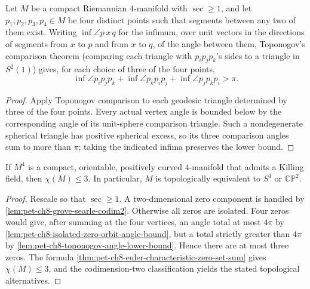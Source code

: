 \begin{lemma}
  \label{lem:pet-ch8-toponogov-angle-lower-bound}

  Let $M$ be a compact Riemannian $4$-manifold with $\sec\ge1$, and let
  $p_1,p_2,p_3,p_4\in M$ be four distinct points such that segments between any
  two of them exist. Writing $\inf\angle p\,x\,q$ for the infimum, over unit
  vectors in the directions of segments from $x$ to $p$ and from $x$ to $q$, of
  the angle between them, Toponogov's comparison theorem (comparing each
  triangle with $p_ip_jp_k$'s sides to a triangle in $S^2(1)$) gives, for each
  choice of three of the four points,
  \[
    \inf\angle p_ip_jp_k+\inf\angle p_kp_ip_j+\inf\angle p_jp_kp_i>\pi.
  \]
\end{lemma}
\begin{proof}
  \sketch
  Apply Toponogov comparison to each geodesic triangle determined by three of
  the four points. Every actual vertex angle is bounded below by the
  corresponding angle of its unit-sphere comparison triangle. Such a
  nondegenerate spherical triangle has positive spherical excess, so its three
  comparison angles sum to more than \(\pi\); taking the indicated infima
  preserves the lower bound.
\end{proof}

\begin{theorem}
  \label{thm:pet-ch8-hsiang-kleiner-4manifold}

  If $M^4$ is a compact, orientable, positively curved $4$-manifold that admits
  a Killing field, then $\chi(M)\le3$. In particular, $M$ is topologically
  equivalent to $S^4$ or $\mathbb{CP}^2$.
\end{theorem}
\begin{proof}
  \sketch
  Rescale so that \(\sec\ge1\). A two-dimensional zero component is handled by
  \cref{lem:pet-ch8-grove-searle-codim2}. Otherwise all zeros are isolated.
  Four zeros would give, after summing at the four vertices, an angle total at
  most \(4\pi\) by
  \cref{lem:pet-ch8-isolated-zero-orbit-angle-bound}, but a total strictly
  greater than \(4\pi\) by
  \cref{lem:pet-ch8-toponogov-angle-lower-bound}. Hence there are at most three
  zeros. The formula
  \cref{thm:pet-ch8-euler-characteristic-zero-set-sum} gives
  \(\chi(M)\le3\), and the codimension-two classification yields the stated
  topological alternatives.
\end{proof}

